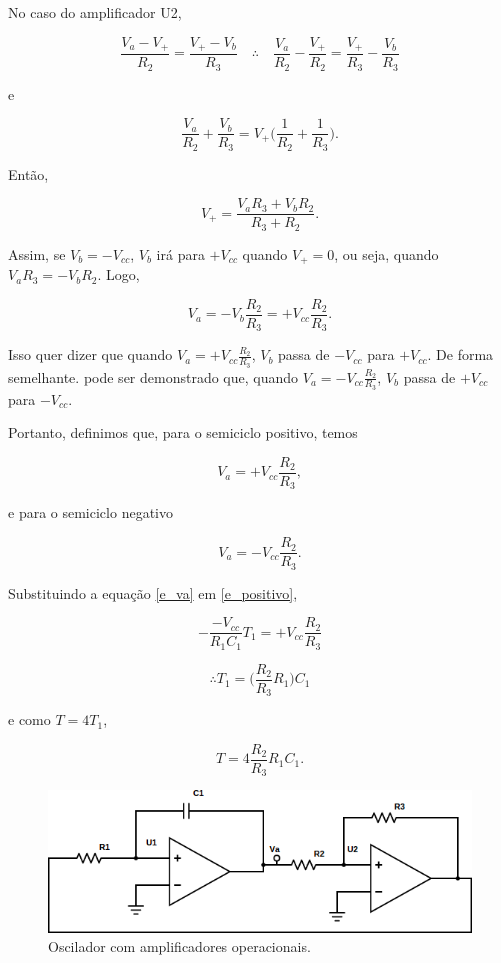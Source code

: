 No caso do amplificador U2,

\[
\frac{V_a - V_+}{R_2} = \frac{V_+ - V_b}{R_3} \quad \therefore \quad \frac{V_a}{R_2} - \frac{V_+}{R_2} = \frac{V_+}{R_3} - \frac{V_b}{R_3}
\]

e

\[
\frac{V_a}{R_2} + \frac{V_b}{R_3} = V_+ \bigg (\frac{1}{R_2} + \frac{1}{R_3} \bigg).
\]

Então, 

\[
    V_+ = \frac{V_aR_3 + V_bR_2}{R_3+R_2}.
\]


Assim, se $V_b = -V_{cc}$, $V_b$ irá para $+V_{cc}$ quando $V_+ = 0$, ou seja, quando $V_aR_3 = -V_bR_2$. Logo,

\[ V_a = -V_b\frac{R_2}{R_3} = +V_{cc}\frac{R_2}{R_3}. \]

Isso quer dizer que quando $V_a = +V_{cc}\frac{R_2}{R_3}$, $V_b$ passa de $-V_{cc}$ para $+V_{cc}$. De forma semelhante. pode ser demonstrado que, quando $V_a = -V_{cc}\frac{R_2}{R_3}$, $V_b$ passa de $+V_{cc}$ para $-V_{cc}$.

Portanto, definimos que, para o semiciclo positivo, temos

\begin{equation}
V_a = +V_{cc}\frac{R_2}{R_3},
\label{e_positivo}
\end{equation}

e para o semiciclo negativo

\begin{equation}
V_a = -V_{cc}\frac{R_2}{R_3}.
\label{e_negativo}
\end{equation}

Substituindo a equação \ref{e_va} em \ref{e_positivo},

\[
-\frac{-V_{cc}}{R_1C_1}T_1 = +V_{cc}\frac{R_2}{R_3}
\]

\[
    \therefore T_1 = \bigg ( \frac{R_2}{R_3}R_1\bigg )C_1
\]

e como $T = 4T_1$,

\begin{equation}
T =  4 \frac{R_2}{R_3} R_1C_1.
\label{e_periodo}
\end{equation}


\begin{figure}[H]
    \centering
    \includegraphics[scale=0.5]{img/sensor.png}
    \caption{Oscilador com amplificadores operacionais.}
    \label{f_sensor}
\end{figure} 

